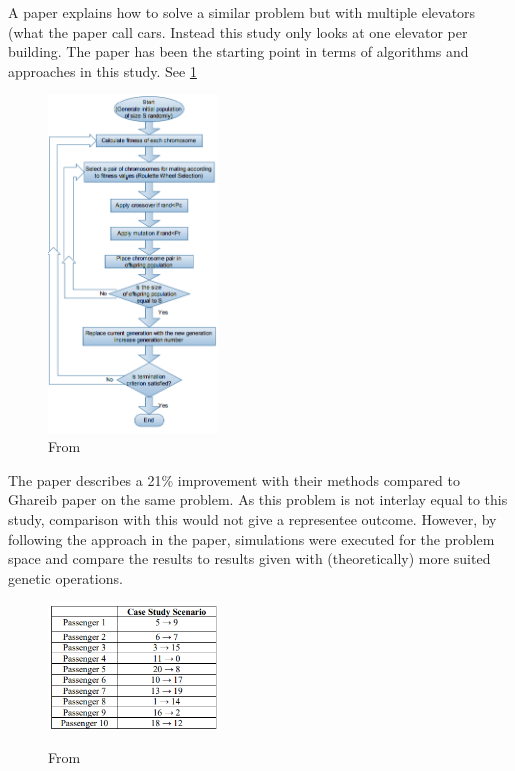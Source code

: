 
A paper\cite{tartan2016genetic} explains how to solve a similar problem but with multiple elevators (what the paper call cars. Instead this study only looks at one elevator per building. The paper has been the starting point in terms of algorithms and approaches in this study. See \ref{fig:Flow_1}

\begin{figure}[ht]
\centering
\includegraphics[width=0.4\textwidth]{diagram_1.png}
\caption{From \cite{tartan2016flow}}
	\label{fig:Flow_1}
\end{figure}
The paper describes a 21\% improvement with their methods compared to Ghareib paper \cite{gharieb2005optimal} on the same problem. As this problem is not interlay equal to this study, comparison with this would not give a representee outcome. However, by following the approach in the paper, simulations were executed for the problem space and compare the results to results given with (theoretically) more suited genetic operations.
\newpage

\begin{figure}[ht]
\centering
\includegraphics[width=0.4\textwidth]{tabel_1.png}
	\label{fig:Tabel_1}
	\caption{From \cite{ahmed2022investigation}}
\end{figure}


